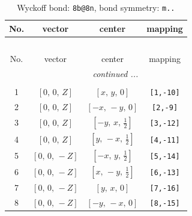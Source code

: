 \documentclass[fleqn,8pt]{jsarticle}
\begin{document}
\begin{longtable}{cccc}
\caption{Wyckoff bond: {\tt 8b@8n}, bond symmetry: {\tt m..}}
 \\
 \hline \hline
No. & vector & center & mapping \\ \hline \endfirsthead

\multicolumn{3}{l}{\tablename\ \thetable{}} \\
 \hline \hline
No. & vector & center & mapping \\ \hline \endhead

 \hline \hline
\multicolumn{3}{r}{\footnotesize\it continued ...} \\ \endfoot

 \hline \hline
\multicolumn{3}{r}{} \\ \endlastfoot

1 & $\left[ 0,\, 0,\, Z \right]$ & $\left[ x,\, y,\, 0 \right]$ & {\tt [1,-10]} \\ \hline
2 & $\left[ 0,\, 0,\, Z \right]$ & $\left[ - x,\, - y,\, 0 \right]$ & {\tt [2,-9]} \\ \hline
3 & $\left[ 0,\, 0,\, Z \right]$ & $\left[ - y,\, x,\, \frac{1}{2} \right]$ & {\tt [3,-12]} \\ \hline
4 & $\left[ 0,\, 0,\, Z \right]$ & $\left[ y,\, - x,\, \frac{1}{2} \right]$ & {\tt [4,-11]} \\ \hline
5 & $\left[ 0,\, 0,\, - Z \right]$ & $\left[ - x,\, y,\, \frac{1}{2} \right]$ & {\tt [5,-14]} \\ \hline
6 & $\left[ 0,\, 0,\, - Z \right]$ & $\left[ x,\, - y,\, \frac{1}{2} \right]$ & {\tt [6,-13]} \\ \hline
7 & $\left[ 0,\, 0,\, - Z \right]$ & $\left[ y,\, x,\, 0 \right]$ & {\tt [7,-16]} \\ \hline
8 & $\left[ 0,\, 0,\, - Z \right]$ & $\left[ - y,\, - x,\, 0 \right]$ & {\tt [8,-15]} \\
\end{longtable}
\renewcommand{\arraystretch}{1.2}
\end{document}
